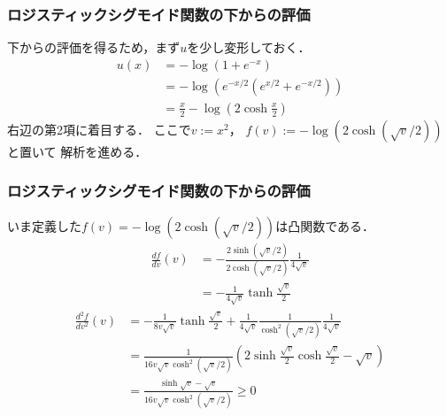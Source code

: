 \documentclass[10pt,hyperref={unicode}]{beamer}
\newcommand{\parentheses}[1]{\left(#1\right)}
\begin{document}
\begin{frame}
\frametitle{ロジスティックシグモイド関数の下からの評価}
下からの評価を得るため，まず$u$を少し変形しておく．
\begin{align*}
    u\parentheses{x}
    &= -\log\parentheses{1 + e^{-x}} \\
    &= -\log\parentheses{e^{-x/2}\parentheses{e^{x/2} + e^{-x/2}}} \\
    &= \frac{x}{2} - \log\parentheses{2\cosh\frac{x}{2}}
\end{align*}
右辺の第2項に着目する．
ここで$v := x^2$，
$f\parentheses{v} := - \log\parentheses{2\cosh\parentheses{\sqrt{v}/2}}$と置いて
解析を進める．
\end{frame}

\begin{frame}
\frametitle{ロジスティックシグモイド関数の下からの評価}
いま定義した$f\parentheses{v} = - \log\parentheses{2\cosh\parentheses{\sqrt{v}/2}}$は凸関数である．
\begin{align*}
    \frac{df}{dv}\parentheses{v}
    &= -\frac{2\sinh\parentheses{\sqrt{v}/2}}{2\cosh\parentheses{\sqrt{v}/2}}\frac{1}{4\sqrt{v}} \\
    &= -\frac{1}{4\sqrt{v}}\tanh\frac{\sqrt{v}}{2}
\end{align*}
\begin{align*}
    \frac{d^2f}{dv^2}\parentheses{v}
    &= -\frac{1}{8v\sqrt{v}} \tanh\frac{\sqrt{v}}{2}
    +\frac{1}{4\sqrt{v}}\frac{1}{\cosh^2\parentheses{\sqrt{v}/2}}\frac{1}{4\sqrt{v}} \\
    &= \frac{1}{16v\sqrt{v}\cosh^2\parentheses{\sqrt{v}/2}}\parentheses{2\sinh\frac{\sqrt{v}}{2}\cosh\frac{\sqrt{v}}{2} - \sqrt{v}} \\
    &= \frac{\sinh \sqrt{v} - \sqrt{v}}{16v\sqrt{v}\cosh^2\parentheses{\sqrt{v}/2}} \geq 0
\end{align*}
\end{frame}
\end{document}
